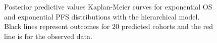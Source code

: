 \documentclass[AMA,STIX1COL]{WileyNJD-v2}
\begin{document}
\begin{figure}[H]
    \centering
    \qquad
    \caption{Posterior predictive values Kaplan-Meier curves for exponential OS and exponential PFS distributions with the hierarchical model. Black lines represent outcomes for 20 predicted cohorts and the red line is for the observed data.}%


\end{figure}
\end{document}
